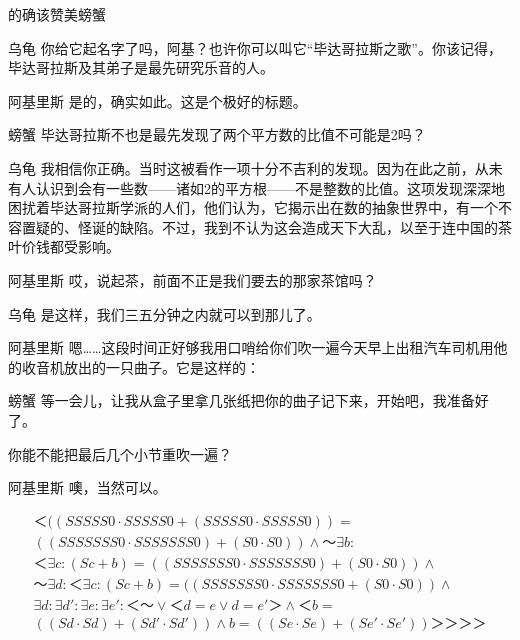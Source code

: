 \begin{dialog}{的确该赞美螃蟹}
\begin{dialogue}
\item[乌龟]你给它起名字了吗，阿基？也许你可以叫它“毕达哥拉斯之歌”。你该记得，毕达哥拉斯及其弟子是最先研究乐音的人。

\item[阿基里斯]是的，确实如此。这是个极好的标题。

\item[螃蟹]毕达哥拉斯不也是最先发现了两个平方数的比值不可能是2吗？

\item[乌龟]我相信你正确。当时这被看作一项十分不吉利的发现。因为在此之前，从未有人认识到会有一些数——诸如2的平方根——不是整数的比值。这项发现深深地困扰着毕达哥拉斯学派的人们，他们认为，它揭示出在数的抽象世界中，有一个不容置疑的、怪诞的缺陷。不过，我到不认为这会造成天下大乱，以至于连中国的茶叶价钱都受影响。

\item[阿基里斯]哎，说起茶，前面不正是我们要去的那家茶馆吗？

\item[乌龟]是这样，我们三五分钟之内就可以到那儿了。

\item[阿基里斯]嗯……这段时间正好够我用口哨给你们吹一遍今天早上出租汽车司机用他的收音机放出的一只曲子。它是这样的：

\item[螃蟹]等一会儿，让我从盒子里拿几张纸把你的曲子记下来，开始吧，我准备好了。


你能不能把最后几个小节重吹一遍？

\item[阿基里斯]噢，当然可以。

\begin{multline*}
＜((SSSSS0\cdot SSSSS0+(SSSSS0\cdot SSSSS0))=\\
((SSSSSSS0\cdot SSSSSSS0)+(S0\cdot S0))∧～\exists b:\\
＜\exists c:(Sc+b)=((SSSSSSS0\cdot SSSSSSS0)+(S0\cdot S0))∧\\
～\exists d:＜\exists c:(Sc+b)=((SSSSSSS0\cdot SSSSSSS0+(S0\cdot S0))∧\\
\exists d:\exists d':\exists e:\exists e':＜～∨＜d=e∨d=e'＞∧＜b=\\
((Sd\cdot Sd)+(Sd'\cdot Sd'))∧b=((Se\cdot Se)+(Se'\cdot Se'))＞＞＞＞
\end{multline*}


\end{dialogue}
\end{dialog}
